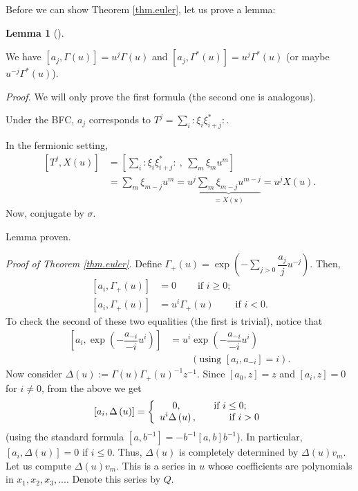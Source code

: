 \documentclass
[numbers=enddot,12pt,final,onecolumn,german,notitlepage]{scrartcl}%
\theoremstyle{definition}
\newtheorem{lem}[theo]{Lemma}
\newenvironment{lemma}[1][]
{\begin{lem}[#1]\begin{leftbar}}
{\end{leftbar}\end{lem}}
\begin{document}
Before we can show Theorem \ref{thm.euler}, let us prove a lemma:

\begin{lemma}
We have $\left[  a_{j},\Gamma\left(  u\right)  \right]  =u^{j}\Gamma\left(
u\right)  $ and $\left[  a_{j},\Gamma^{\ast}\left(  u\right)  \right]
=u^{j}\Gamma^{\ast}\left(  u\right)  $ (or maybe $u^{-j}\Gamma^{\ast}\left(
u\right)  $).
\end{lemma}

\textit{Proof.} We will only prove the first formula (the second one is analogous).

Under the BFC, $a_{j}$ corresponds to $T^{j}=\sum\limits_{i}:\xi_{i}\xi
_{i+j}^{\ast}:$.

In the fermionic setting,%
\begin{align*}
\left[  T^{j},X\left(  u\right)  \right]   &  =\left[  \sum\limits_{i}:\xi
_{i}\xi_{i+j}^{\ast}:\ ,\ \sum\limits_{m}\xi_{m}u^{m}\right] \\
&  =\sum\limits_{m}\xi_{m-j}u^{m}=u^{j}\underbrace{\sum\limits_{m}\xi
_{m-j}u^{m-j}}_{=X\left(  u\right)  }=u^{j}X\left(  u\right)  .
\end{align*}
Now, conjugate by $\sigma$.

Lemma proven.

\textit{Proof of Theorem \ref{thm.euler}.} Define $\Gamma_{+}\left(  u\right)
=\exp\left(  -\sum\limits_{j>0}\dfrac{a_{j}}{j}u^{-j}\right)  $. Then,%
\begin{align*}
\left[  a_{i},\Gamma_{+}\left(  u\right)  \right]   &
=0\ \ \ \ \ \ \ \ \ \ \text{if }i\geq0;\\
\left[  a_{i},\Gamma_{+}\left(  u\right)  \right]   &  =u^{i}\Gamma_{+}\left(
u\right)  \ \ \ \ \ \ \ \ \ \ \text{if }i<0.
\end{align*}
To check the second of these two equalities (the first is trivial), notice
that
\begin{align*}
\left[  a_{i},\exp\left(  -\dfrac{a_{-i}}{-i}u^{i}\right)  \right]   &
=u^{i}\exp\left(  -\dfrac{a_{-i}}{-i}u^{i}\right) \\
&  \ \ \ \ \ \ \ \ \ \ \left(  \text{using }\left[  a_{i},a_{-i}\right]
=i\right)  .
\end{align*}
Now consider $\Delta\left(  u\right)  :=\Gamma\left(  u\right)  \Gamma
_{+}\left(  u\right)  ^{-1}z^{-1}$. Since $\left[  a_{0},z\right]  =z$ and
$\left[  a_{i},z\right]  =0$ for $i\neq0$, from the above we get%
\[
\left[  a_{i},\Delta\left(  u\right)  \right]  =\left\{
\begin{array}
[c]{c}%
0,\ \ \ \ \ \ \ \ \ \ \text{if }i\leq0;\\
u^{i}\Delta\left(  u\right)  ,\ \ \ \ \ \ \ \ \ \ \text{if }i>0
\end{array}
\right.
\]
(using the standard formula $\left[  a,b^{-1}\right]  =-b^{-1}\left[
a,b\right]  b^{-1}$). In particular, $\left[  a_{i},\Delta\left(  u\right)
\right]  =0$ if $i\leq0$. Thus, $\Delta\left(  u\right)  $ is completely
determined by $\Delta\left(  u\right)  v_{m}$. Let us compute $\Delta\left(
u\right)  v_{m}$. This is a series in $u$ whose coefficients are polynomials
in $x_{1},x_{2},x_{3},...$. Denote this series by $Q$.
\end{document}
